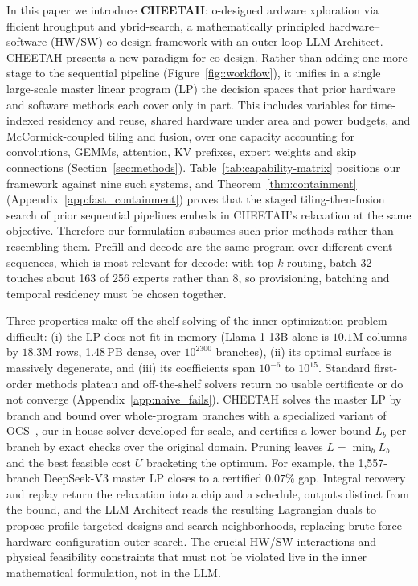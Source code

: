 In this paper we introduce \textbf{\textsc{CHEETAH}}: o-designed ardware xploration via fficient hroughput and ybrid-search, a mathematically principled hardware--software (HW/SW) co-design framework with an outer-loop LLM Architect.
CHEETAH presents a new paradigm for co-design.
Rather than adding one more stage to the sequential pipeline (Figure~\ref{fig::workflow}), it unifies in a single large-scale master linear program (LP) the decision spaces that prior hardware and software methods each cover only in part.
This includes variables for time-indexed residency and reuse, shared hardware under area and power budgets, and McCormick-coupled tiling and fusion, over one capacity accounting for convolutions, GEMMs, attention, KV prefixes, expert weights and skip connections (Section~\ref{sec:methods}).
Table~\ref{tab:capability-matrix} positions our framework against nine such systems, and Theorem~\ref{thm:containment} (Appendix~\ref{app:fast_containment}) proves that the staged tiling-then-fusion search of prior sequential pipelines embeds in CHEETAH's relaxation at the same objective.
Therefore our formulation subsumes such prior methods rather than resembling them.
Prefill and decode are the same program over different event sequences, which is most relevant for decode: with top-$k$ routing, batch 32 touches about 163 of 256 experts rather than 8, so provisioning, batching and temporal residency must be chosen together.

Three properties make off-the-shelf solving of the inner optimization problem difficult: (i) the LP does not fit in memory (Llama-1 13B alone is $10.1$M columns by $18.3$M rows, 1.48\,PB dense, over $10^{2300}$ branches), (ii) its optimal surface is massively degenerate, and (iii) its coefficients span $10^{-6}$ to $10^{15}$.
Standard first-order methods plateau and off-the-shelf solvers return no usable certificate or do not converge (Appendix~\ref{app:naive_fails}).
CHEETAH solves the master LP by branch and bound over whole-program branches with a specialized variant of OCS~\citep{feng2026ocs}, our in-house solver developed for scale, and certifies a lower bound $L_b$ per branch by exact checks over the original domain.
Pruning leaves $L=\min_bL_b$ and the best feasible cost $U$ bracketing the optimum.
For example, the 1,557-branch DeepSeek-V3 master LP closes to a certified $0.07\%$ gap.
Integral recovery and replay return the relaxation into a chip and a schedule, outputs distinct from the bound, and the LLM Architect reads the resulting Lagrangian duals to propose profile-targeted designs and search neighborhoods, replacing brute-force hardware configuration outer search.
The crucial HW/SW interactions and physical feasibility constraints that must not be violated live in the inner mathematical formulation, not in the LLM.

